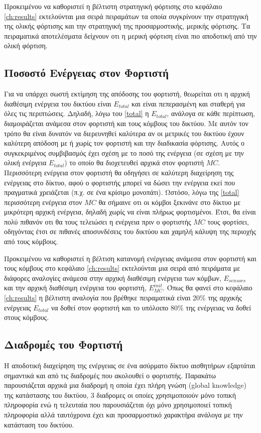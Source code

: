 Προκειμένου να καθοριστεί η βέλτιστη στρατηγική φόρτισης στο κεφάλαιο \ref{ch:results} εκτελούνται μια σειρά πειραμάτων τα οποία συγκρίνουν την στρατηγική της ολικής
φόρτισης και την στρατηγική της προσαρμοστικής, μερικής φόρτισης. Τα πειραματικά αποτελέσματα δείχνουν οτι η μερική φόρτιση είναι πιο αποδοτική από την ολική φόρτιση.

\subsection{Ποσοστό Ενέργειας στον Φορτιστή}
Για να υπάρχει σωστή εκτίμηση της απόδοσης του φορτιστή, θεωρείται οτι η αρχική διαθέσιμη ενέργεια του δικτύου είναι $E_{total}$ και είναι πεπερασμένη και σταθερή
για όλες τις περιπτώσεις. Δηλαδή, λόγω του \ref{total} η $E_{total}$, ανάλογα σε κάθε περίπτωση, διαμοιράζεται ανάμεσα στον φορτιστή και τους κόμβους του δικτύου. Με
αυτόν τον τρόπο θα είναι δυνατόν να διερευνηθεί καλύτερα αν οι μετρικές του δικτύου έχουν καλύτερη απόδοση με ή χωρίς τον φορτιστή και την διαδικασία φόρτισης. Αυτός
ο συγκεκριμένος συμβιβασμός έχει σχέση με το ποσό της ενέργεια (σε σχέση με την ολική ενέργεια $E_{total}$) το οποίο θα διοχετευθεί αρχικά στον φορτιστή $MC$.
Περισσότερη ενέργεια στον φορτιστή θα οδηγήσει σε καλύτερη διαχείρηση της ενέργειας στο δίκτυο, αφού ο φορτιστής μπορεί να δώσει την ενέργεια εκεί που πραγματικά
χρειάζεται (π.χ. σε ένα κρίσιμο μονοπάτι). Ωστόσο, λόγω της \ref{total} περισσότερη ενέργεια στον $MC$ θα σήμαινε οτι οι κόμβοι ξεκινάνε στο δίκτυο με μικρότερη
αρχική ενέργεια, δηλαδή χωρίς να είναι πλήρως φορτισμένοι. Έτσι, θα είναι πολύ πιθανόν οτι θα τους τελειώσει η ενέργεια πριν ο φορτιστής $MC$ τους φορτίσει,
οδηγόντας έτσι σε πιθανές αποσυνδέσεις του δικτύου και χαμηλή κάλυψη της περιοχής από τους κόμβους.

Προκειμένου να καθοριστεί η βέλτιση κατανομή ενέργειας ανάμεσα στον φορτιστή και τους κόμβους στο κεφάλαιο \ref{ch:results} εκτελούνται μια σειρά από πειράματα με
διάφορες αναλογίες ανάμεσα στην αρχική διαθέσιμη ενέργεια των κόμβων, $E_{sensors}$ και την αρχική διαθέσιμη ενέργεια του φορτιστή, $E^{init}_{MC}$. Όπως θα φανεί στο
κεφάλαιο \ref{ch:results} η βέλτιστη αναλογία που βρέθηκε πειραματικά είναι 20\% της αρχικής ενέργειας $E_{total}$ να δοθεί στον φορτιστή και το υπόλοιπο 80\% της
ενέργειας να δοθεί στους κόμβους.

\subsection{Διαδρομές του Φορτιστή}
Η αποδοτική διαχείρηση της ενέργειας σε ένα ασύρματο δίκτυο αισθητήρων εξαρτάται σημαντικά και από τις διαδρομές που ακολουθεί ο φορτιστής. Παρακάτω παρουσιάζεται
αρχικά μια διαδρομή η οποία έχει πλήρη γνώση (global knowledge) της κατάστασης του δικτύου, 3 διαδρομες οι οποίες χρησιμοποιούν μόνο τοπική πληροφορία ενώ η
τελευταία που παρουσιάζεται όχι μόνο χρησιμοποιεί τοπική πληροφορία αλλά ταυτόχρονα έχει και προσαρμοστικό χαρακτήρα ανάλογα με την κατάσταση του δικτύου.


